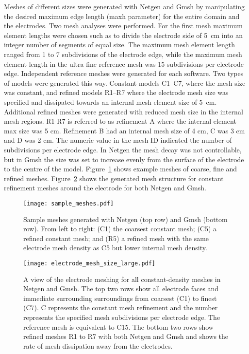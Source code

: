 \documentclass[12pt]{iopart}
\begin{document}
Meshes of different sizes were generated with Netgen and Gmsh by manipulating the desired
maximum edge length (maxh parameter) for the entire domain and the electrodes.
Two  mesh analyses were performed. For the first
mesh maximum element lengths were
chosen such as to divide the electrode side of 5~cm into an integer number of
segments of equal size. 
The maximum mesh element length ranged from 1 to 7 subdivisions of the electrode 
edge, while the maximum mesh element length in the ultra-fine reference mesh  
was 15 subdivisions per 
electrode edge. Independent reference meshes were generated for each software.
Two types of models were generated this way. Constant models C1--C7, where the mesh size 
was constant, and refined models R1--R7 where the electrode mesh size was specified and 
dissipated towards an internal mesh element size of 5 cm. Additional refined meshes were
generated with reduced mesh size in the internal mesh regions.  
R1-R7 is referred to as refinement A where the internal element max size was 5 cm. Refinement 
B had an internal mesh size of 4 cm, C was 3 cm and D was 2 cm.
The numeric value in the mesh 
ID indicated the number of subdivisions per electrode edge. 
In Netgen the mesh decay was not controllable, but in Gmsh the size was set 
to increase evenly from the surface of the electrode to the centre of the model.
Figure~\ref{fig:sample_meshes} shows example meshes of coarse, fine and refined
meshes. Figure~\ref{fig:electrode_mesh_size} shows the generated mesh structure for 
constant refinement meshes around the electrode 
for both Netgen and Gmsh. 


\begin{figure}
   \texttt{[image: sample\_meshes.pdf]}
   \caption{\label{fig:sample_meshes} Sample meshes generated with Netgen (top row)
   and Gmsh (bottom row). From left to right: (C1) the coarsest constant
   mesh; (C5) a refined constant mesh; and (R5) a refined mesh with the same
   electrode mesh density as C5 but lower internal mesh density.}
\end{figure}

\begin{figure}
  \texttt{[image: electrode\_mesh\_size\_large.pdf]}
  \caption{\label{fig:electrode_mesh_size} A view of the electrode meshing for all constant-density meshes 
  in Netgen and Gmsh. The top two rows show all electrode faces and immediate surrounding
  surroundings from coarsest (C1) to finest (C7). C represents the constant mesh refinement and the number
  represents the specified mesh subdivisions per electrode edge. The reference mesh is equivalent to C15.
  The bottom two rows show refined meshes R1 to R7 with both Netgen and Gmsh and shows the rate of mesh
  dissipation away from the electrodes.}
\end{figure}
\end{document}
